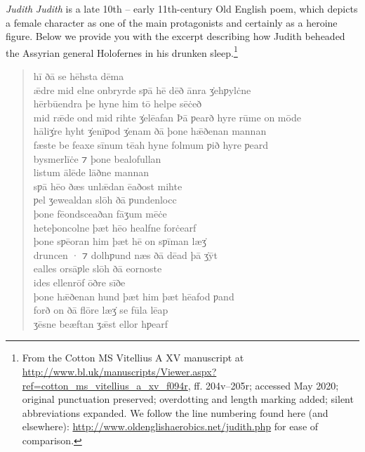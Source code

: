 \begin{texts}{\textit{Judith}}
\textit{Judith} is a late 10th -- early 11th-century Old English poem, which depicts a female character as one of the main protagonists and certainly as a heroine figure. Below we provide you with the excerpt describing how Judith beheaded the Assyrian general Holofernes in his drunken sleep.\footnote{From the Cotton MS Vitellius A XV manuscript at \url{http://www.bl.uk/manuscripts/Viewer.aspx?ref=cotton_ms_vitellius_a_xv_f094r}, ff. 204v–205r; accessed May 2020; original punctuation preserved; overdotting and length marking added; silent abbreviations expanded. We follow the line numbering found here (and elsewhere): \url{http://www.oldenglishaerobics.net/judith.php} for ease of comparison.}

\begin{quote}
    hī ðā se hēhsta dēma\\
    ǣdre mid elne onbryrde     sƿā hē dēð ānra \.{ʒ}ehƿylċne\\
    hērbūendra     þe hyne him tō helpe sēċeð\\
    mid rǣde ond mid rihte \.{ʒ}elēafan     Þā ƿearð hyre rūme on mōde\\
    hāli\.{ʒ}re hyht \.{ʒ}enīƿod     \.{ʒ}enam ðā þone hǣðenan mannan\\
    fæste be feaxe sīnum     tēah hyne folmum ƿið hyre ƿeard\\
    bysmerlīċe     ⁊ þone bealofullan\\
    listum ālēde     lāðne mannan\\
    sƿā hēo ðæs unlǣdan     ēaðost mihte\\
    ƿel ʒewealdan     slōh ðā ƿundenlocc\\
    þone fēondsceaðan     fāʒum mēċe\\
    heteþoncolne     þæt hēo healfne forċearf\\
    þone sƿēoran him     þæt hē on sƿīman læ\.{ʒ}\\
    druncen · ⁊ dolhƿund     næs ðā dēad þā \.{ʒ}ȳt\\
    ealles orsāƿle     slōh ðā eornoste\\
    ides ellenrōf     ōðre sīðe\\
    þone hǣðenan hund     þæt him þæt hēafod ƿand\\
    forð on ðā flōre     læ\.{ʒ} se fūla lēap\\
    ʒēsne beæftan     ʒǣst ellor hƿearf\\

\end{quote}
\end{texts}

